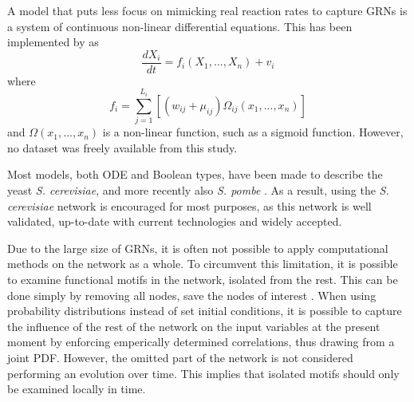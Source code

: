 \documentclass[../main.tex]{subfiles}
\begin{document}
A model that puts less focus on mimicking real reaction rates to capture GRNs is a system of continuous non-linear differential equations.
This has been implemented by \cite{qian2008inference} as
%
\begin{equation}
\frac{dX_i}{dt} = f_i \left( X_1,...,X_n \right) + v_i
\end{equation}
%
where
%
\begin{equation}
f_i = \sum_{j=1}^{L_i} [(w_{ij}+ \mu_{ij})\Omega_{ij}\left( x_1,...,x_n\right)]
\end{equation}
%
and $\Omega\left( x_1,...,x_n\right)$ is a non-linear function, such as a sigmoid function.
However, no dataset was freely available from this study.

Most models, both ODE and Boolean types, have been made to describe the yeast \textit{S. cerevisiae}, and more recently also \textit{S. pombe} \cite{ferrell2011modeling}. 
As a result, using the \textit{S. cerevisiae} network is encouraged for most purposes, as this network is well validated, up-to-date with current technologies and widely accepted.

Due to the large size of GRNs, it is often not possible to apply computational methods on the network as a whole.
To circumvent this limitation, it is possible to examine functional motifs in the network, isolated from the rest.
This can be done simply by removing all nodes, save the nodes of interest \cite{zhang2012chaotic}.
When using probability distributions instead of set initial conditions, it is possible to capture the influence of the rest of the network on the input variables at the present moment by enforcing emperically determined correlations, thus drawing from a joint PDF.
However, the omitted part of the network is not considered performing an evolution over time.
This implies that isolated motifs should only be examined locally in time. %
\end{document}
